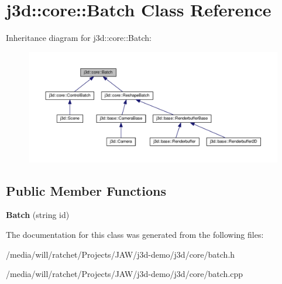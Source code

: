 \hypertarget{classj3d_1_1core_1_1Batch}{}\section{j3d\+:\+:core\+:\+:Batch Class Reference}
\label{classj3d_1_1core_1_1Batch}


Inheritance diagram for j3d\+:\+:core\+:\+:Batch\+:
\nopagebreak
\begin{figure}[H]
\begin{center}
\leavevmode
\includegraphics[width=350pt]{classj3d_1_1core_1_1Batch__inherit__graph}
\end{center}
\end{figure}
\subsection*{Public Member Functions}
\begin{DoxyCompactItemize}
\item 
\hypertarget{classj3d_1_1core_1_1Batch_a7f905c40386d89a6fa9392287ece7efc}{}{\bfseries Batch} (string id)\label{classj3d_1_1core_1_1Batch_a7f905c40386d89a6fa9392287ece7efc}

\end{DoxyCompactItemize}


The documentation for this class was generated from the following files\+:\begin{DoxyCompactItemize}
\item 
/media/will/ratchet/\+Projects/\+J\+A\+W/j3d-\/demo/j3d/core/batch.\+h\item 
/media/will/ratchet/\+Projects/\+J\+A\+W/j3d-\/demo/j3d/core/batch.\+cpp\end{DoxyCompactItemize}
